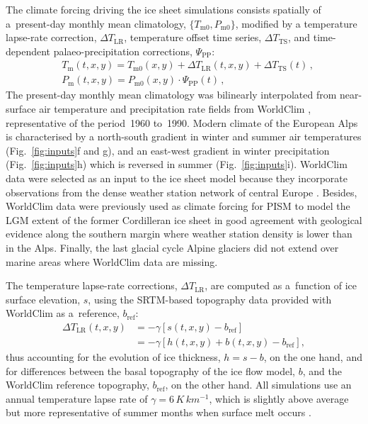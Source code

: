 \documentclass[tc, manuscript]{copernicus}
\begin{document}
    The climate forcing driving the ice sheet simulations consists spatially of
    a~present-day monthly mean climatology,
    $\{T_{\mathrm{m}0}, P_{\mathrm{m}0}\}$, modified by a temperature lapse-rate
    correction, ${\Delta}T_{\text{LR}}$, temperature
    offset time series, ${\Delta}T_{\text{TS}}$, and time-dependent
    palaeo-precipitation corrections, $\Psi_{\text{PP}}$:
    \begin{align}
      &T_{\mathrm{m}}(t, x, y) = T_{\mathrm{m}0}(x, y) +
                                 {\Delta}T_{\text{LR}}(t, x, y) +
                                 {\Delta}T_{\text{TS}}(t) \,, \\
      &P_{\mathrm{m}}(t, x, y) = P_{\mathrm{m}0}(x, y) \cdot
                                 {\Psi}_{\text{PP}}(t) \,,
    \end{align}
    The present-day monthly mean climatology was bilinearly interpolated from
    near-surface air temperature and precipitation rate fields from
    WorldClim \citep{Hijmans.etal.2005}, representative of the period~1960
    to~1990. Modern climate of the European Alps is characterised by a
    north-south gradient in winter and summer air temperatures
    (Fig.~\ref{fig:inputs}f and g), and an east-west gradient in winter
    precipitation (Fig.~\ref{fig:inputs}h) which is reversed in summer
    (Fig.~\ref{fig:inputs}i). WorldClim data
    were selected as an input to the ice sheet model because they incorporate
    observations from the dense weather station network of central Europe
    \citep[Fig.~1]{Hijmans.etal.2005}. Besides, WorldClim data were
    previously used as climate forcing for PISM to model the LGM extent of the
    former Cordilleran ice sheet in good agreement with geological evidence
    along the southern margin \citep{Seguinot.etal.2014} where weather station
    density is lower than in the Alps. Finally, the last glacial cycle Alpine
    glaciers did not extend over marine areas where WorldClim data are missing.

    The temperature lapse-rate corrections, ${\Delta}T_{\text{LR}}$, are
    computed as a~function of ice surface elevation, $s$, using the SRTM-based
    topography data provided with WorldClim as a~reference, $b_{\text{ref}}$:
    \begin{align}
      {\Delta}T_{\text{LR}}(t, x, y) &= -\gamma [s(t, x, y)-b_{\text{ref}}] \\
                                     &= -\gamma [h(t, x, y)+
                                                 b(t, x, y)-b_{\text{ref}}],
    \end{align}
    thus accounting for the evolution of ice thickness, ${h=s-b}$, on the one
    hand, and for differences between the basal topography of the ice flow
    model, $b$, and the WorldClim reference topography, $b_{\text{ref}}$, on
    the other hand. All simulations use an annual temperature lapse rate of
    $\gamma=6\,\unit{K\,km^{-1}}$, which is slightly above average but more
    representative of summer months when surface melt occurs
    \citep[Fig.~3]{Rolland.2003}.
\end{document}
